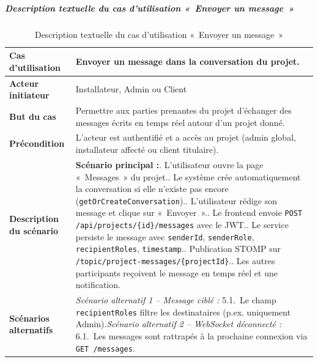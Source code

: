 \subparagraph{Description textuelle du cas d'utilisation «~Envoyer un message~»}

\begin{table}[H]
  \caption{Description textuelle du cas d'utilisation «~Envoyer un message~»}
  \label{tab:cu-envoyer-message}
  \centering
  \begin{tabularx}{\textwidth}{|L{3.8cm}|X|}
    \hline
    \textbf{Cas d'utilisation} & Envoyer un message dans la conversation du projet. \\
    \hline
    \textbf{Acteur initiateur} & Installateur, Admin ou Client \\
    \hline
    \textbf{But du cas} & Permettre aux parties prenantes du projet d'échanger des messages écrits en temps réel autour d'un projet donné. \\
    \hline
    \textbf{Précondition} & L'acteur est authentifié et a accès au projet (admin global, installateur affecté ou client titulaire). \\
    \hline
    \textbf{Description du scénario} &
    \textbf{Scénario principal :}. L'utilisateur ouvre la page «~Messages~» du projet.. Le système crée automatiquement la conversation si elle n'existe pas encore (\texttt{getOrCreateConversation}).. L'utilisateur rédige son message et clique sur «~Envoyer~».. Le frontend envoie \texttt{POST /api/projects/\{id\}/messages} avec le JWT.. Le service persiste le message avec \texttt{senderId}, \texttt{senderRole}, \texttt{recipientRoles}, \texttt{timestamp}.. Publication STOMP sur \texttt{/topic/project-messages/\{projectId\}}.. Les autres participants reçoivent le message en temps réel et une notification.\\
    \hline
    \textbf{Scénarios alternatifs} &
    \textit{Scénario alternatif 1 -- Message ciblé :}\newline
    \hspace*{6pt}5.1.~Le champ \texttt{recipientRoles} filtre les destinataires (p.ex. uniquement Admin).\newline[2pt]
    \textit{Scénario alternatif 2 -- WebSocket déconnecté :}\newline
    \hspace*{6pt}6.1.~Les messages sont rattrapés à la prochaine connexion via \texttt{GET /messages}.\\
    \hline
  \end{tabularx}
\end{table}

